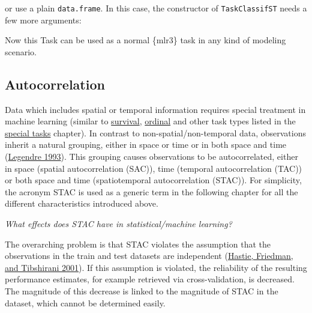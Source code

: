 \documentclass[
]{scrbook}
\newenvironment{Shaded}{\begin{snugshade}}{\end{snugshade}}
\newcommand{\AttributeTok}[1]{\textcolor[rgb]{0.77,0.63,0.00}{#1}}
\newcommand{\FunctionTok}[1]{\textcolor[rgb]{0.00,0.00,0.00}{#1}}
\newcommand{\NormalTok}[1]{#1}
\newcommand{\OtherTok}[1]{\textcolor[rgb]{0.56,0.35,0.01}{#1}}
\newcommand{\SpecialCharTok}[1]{\textcolor[rgb]{0.00,0.00,0.00}{#1}}
\newcommand{\StringTok}[1]{\textcolor[rgb]{0.31,0.60,0.02}{#1}}
\renewenvironment{Shaded} {\begin{snugshade}\small} {\end{snugshade}}
\begin{document}
or use a plain \texttt{data.frame}.
In this case, the constructor of \texttt{TaskClassifST} needs a few more arguments:

\begin{Shaded}
\end{Shaded}

Now this Task can be used as a normal \{mlr3\} task in any kind of modeling scenario.

\hypertarget{spatiotemporal-intro}{%
\subsection{Autocorrelation}\label{spatiotemporal-intro}}

Data which includes spatial or temporal information requires special treatment in machine learning (similar to \protect\hyperlink{survival}{survival}, \protect\hyperlink{ordinal}{ordinal} and other task types listed in the \protect\hyperlink{special-tasks}{special tasks} chapter).
In contrast to non-spatial/non-temporal data, observations inherit a natural grouping, either in space or time or in both space and time (\protect\hyperlink{ref-legendre1993}{Legendre 1993}).
This grouping causes observations to be autocorrelated, either in space (spatial autocorrelation (SAC)), time (temporal autocorrelation (TAC)) or both space and time (spatiotemporal autocorrelation (STAC)).
For simplicity, the acronym STAC is used as a generic term in the following chapter for all the different characteristics introduced above.

\emph{What effects does STAC have in statistical/machine learning?}

The overarching problem is that STAC violates the assumption that the observations in the train and test datasets are independent (\protect\hyperlink{ref-hastie2001}{Hastie, Friedman, and Tibshirani 2001}).
If this assumption is violated, the reliability of the resulting performance estimates, for example retrieved via cross-validation, is decreased.
The magnitude of this decrease is linked to the magnitude of STAC in the dataset, which cannot be determined easily.
\end{document}
